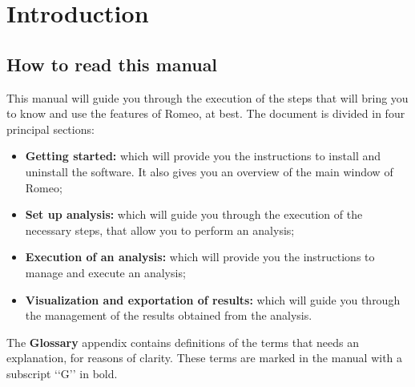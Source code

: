 \section{Introduction}
\label{introduction}

\subsection{How to read this manual}
\label{howtoread}
This manual will guide you through the execution of the steps that will bring you to know and use the features of Romeo, at best. The document is divided in four principal sections:
\begin{itemize}
\item \textbf{Getting started:} which will provide you the instructions to install and uninstall the software. It also gives you an overview of the main window of Romeo;
\item \textbf{Set up analysis:} which will guide you through the execution of the necessary steps, that allow you to perform an analysis;
\item \textbf{Execution of an analysis:} which will provide you the instructions to manage and execute an analysis;
\item \textbf{Visualization and exportation of results:} which will guide you through the management of the results obtained from the analysis.
\end{itemize}
The \textbf{Glossary} appendix contains definitions of the terms that needs an explanation, for reasons of clarity. These terms are marked in the manual with a subscript \lq\lq{}G\rq\rq{} in bold.

